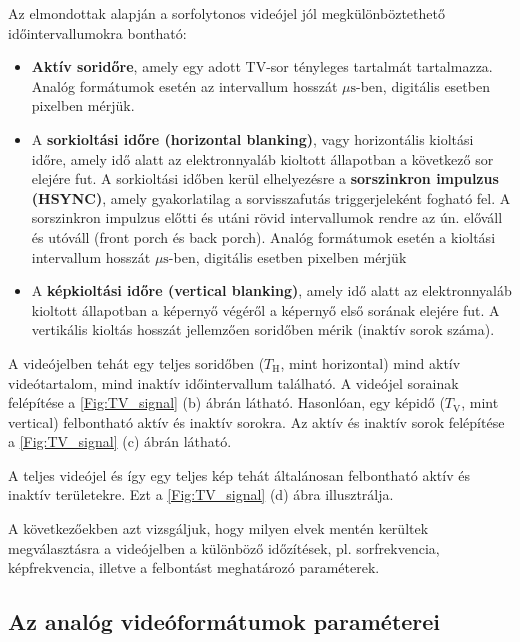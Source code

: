 Az elmondottak alapján a sorfolytonos videójel jól megkülönböztethető időintervallumokra bontható:
\begin{itemize}
\item \textbf{Aktív soridőre}, amely egy adott TV-sor tényleges tartalmát tartalmazza.
Analóg formátumok esetén az intervallum hosszát $\mu \mathrm{s}$-ben, digitális esetben pixelben mérjük.
\item A \textbf{sorkioltási időre (horizontal blanking)}, vagy horizontális kioltási időre, amely idő alatt az elektronnyaláb kioltott állapotban a következő sor elejére fut.
A sorkioltási időben kerül elhelyezésre a \textbf{sorszinkron impulzus (HSYNC)}, amely gyakorlatilag a sorvisszafutás triggerjeleként fogható fel.
A sorszinkron impulzus előtti és utáni rövid intervallumok rendre az ún. előváll és utóváll (front porch és back porch).
Analóg formátumok esetén a kioltási intervallum hosszát $\mu \mathrm{s}$-ben, digitális esetben pixelben mérjük
\item A \textbf{képkioltási időre (vertical blanking)}, amely idő alatt az elektronnyaláb kioltott állapotban a képernyő végéről a képernyő első sorának elejére fut.
A vertikális kioltás hosszát jellemzően soridőben mérik (inaktív sorok száma).
\end{itemize}
A videójelben tehát egy teljes soridőben ($T_{\mathrm{H}}$, mint horizontal) mind aktív videótartalom, mind inaktív időintervallum található.
A videójel sorainak felépítése a \ref{Fig:TV_signal} (b) ábrán látható.
Hasonlóan, egy képidő ($T_{\mathrm{V}}$, mint vertical) felbontható aktív és inaktív sorokra.
Az aktív és inaktív sorok felépítése a \ref{Fig:TV_signal} (c) ábrán látható.

A teljes videójel és így egy teljes kép tehát általánosan felbontható aktív és inaktív területekre.
Ezt a \ref{Fig:TV_signal} (d) ábra illusztrálja.

A következőekben azt vizsgáljuk, hogy milyen elvek mentén kerültek megválasztásra a videójelben a különböző időzítések, pl. sorfrekvencia, képfrekvencia, illetve a felbontást meghatározó paraméterek.

\subsection{Az analóg videóformátumok paraméterei}

